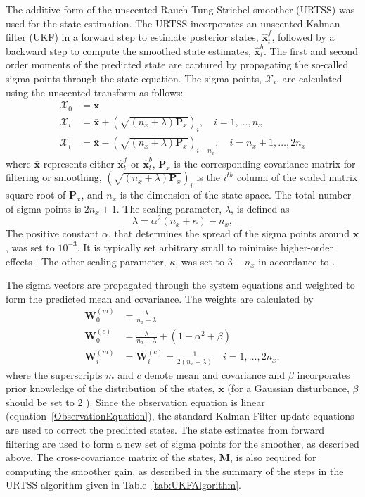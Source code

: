 \documentclass[review,authoryear,3p]{elsarticle}
\begin{document}
The additive form of the unscented Rauch-Tung-Striebel smoother (URTSS) \citep{Sarkka2010} was used for the state estimation. The URTSS incorporates an unscented Kalman filter (UKF) \citep{Julier1997, Merwe2003} in a forward step to estimate posterior states, $\hat{\mathbf x}_t^{f}$, followed by a backward step to compute the smoothed state estimates, $\hat{\mathbf x}_t^{b}$. The first and second order moments of the predicted state are captured by propagating the so-called sigma points through the state equation. The sigma points, $\mathcal X_i$, are calculated using the unscented transform as follows:
\begin{align}\label{eq:sigmapoints1}
	\mathcal X_{0}&=\mathbf{\bar x} \\
	\mathcal X_{i}&= \mathbf{\bar x}+\left(\sqrt{( n_x + \lambda)\mathbf P_x}\right)_i, \quad i=1, \dots, n_x \\
	\mathcal X_{i}&=\mathbf{\bar x}-\left(\sqrt{( n_x + \lambda)\mathbf P_x}\right)_{i- n_x}, \quad i= n_x+1, \dots, 2n_x 
\end{align}
where $\mathbf{\bar x}$ represents either $\hat{\mathbf x}_t^{f}$ or $\hat{\mathbf x}_t^{b}$, $\mathbf{P}_x$ is the corresponding covariance matrix for filtering or smoothing, $\left(\sqrt{( n_x + \lambda)\mathbf P_x}\right)_i$ is the $i^{th}$ column of the scaled matrix square root of $\mathbf P_x$, and $n_x$ is the dimension of the state space. The total number of sigma points is $2n_x+1$. The scaling parameter, $\lambda$, is defined as 
\begin{equation}\label{eq:sigmapoints3}
	\lambda=\alpha^2( n_x+\kappa) - n_x, 
\end{equation}
The positive constant $\alpha$, that determines the spread of the sigma points around $\mathbf{\bar x}$, was set to $10^{-3}$. It is typically set arbitrary small to minimise higher-order effects \citep{Haykin2001}. The other scaling parameter, $\kappa$, was set to $3-n_x$ in accordance to \citet{Julier2002a}.

The sigma vectors are propagated through the system equations and weighted to form the predicted mean and covariance. The weights are calculated by 
\begin{align}
	\mathbf W_0^{(m)}&=\frac{\lambda}{ n_x+\lambda} \\
	\mathbf W_0^{(c)}&=\frac{\lambda}{ n_x+\lambda}+(1-\alpha^2+\beta) \\
	\mathbf W_i^{(m)}&=\mathbf W_i^{(c)}=\frac{1}{2( n_x+\lambda)} \quad i=1, \dots, 2n_x, 
\end{align}
where the superscripts $m$ and $c$ denote mean and covariance and $\beta$ incorporates prior knowledge of the distribution of the states, $\mathbf{x}$ (for a Gaussian disturbance, $\beta$ should be set to 2 \citep{Haykin2001}). Since the observation equation is linear (equation~\ref{ObservationEquation}), the standard Kalman Filter update equations are used to correct the predicted states. The state estimates from forward filtering are used to form a new set of sigma points for the smoother, as described above. The cross-covariance matrix of the states, $\mathbf M$, is also required for computing the smoother gain, as described in the summary of the steps in the URTSS algorithm given in Table~\ref{tab:UKFAlgorithm}.
\end{document}

